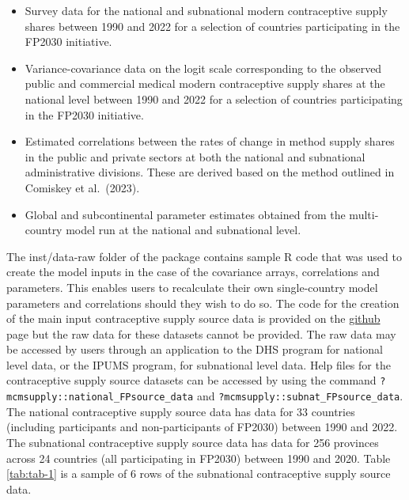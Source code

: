 \begin{itemize}
\tightlist
\item
  Survey data for the national and subnational modern contraceptive supply shares between 1990 and 2022 for a selection of countries participating in the FP2030 initiative.
\item
  Variance-covariance data on the logit scale corresponding to the observed public and commercial medical modern contraceptive supply shares at the national level between 1990 and 2022 for a selection of countries participating in the FP2030 initiative.
\item
  Estimated correlations between the rates of change in method supply shares in the public and private sectors at both the national and subnational administrative divisions. These are derived based on the method outlined in Comiskey et al.~(2023).
\item
  Global and subcontinental parameter estimates obtained from the multi-country model run at the national and subnational level.
\end{itemize}

The inst/data-raw folder of the  package contains sample R code that was used to create the model inputs in the case of the covariance arrays, correlations and parameters. This enables users to recalculate their own single-country model parameters and correlations should they wish to do so. The code for the creation of the main input contraceptive supply source data is provided on the  \href{https://github.com/hannahcomiskey/mcmsupply}{github} page but the raw data for these datasets cannot be provided. The raw data may be accessed by users through an application to the DHS program for national level data, or the IPUMS program, for subnational level data. Help files for the contraceptive supply source datasets can be accessed by using the command \texttt{?mcmsupply::national\_FPsource\_data} and \texttt{?mcmsupply::subnat\_FPsource\_data}. The national contraceptive supply source data has data for 33 countries (including participants and non-participants of FP2030) between 1990 and 2022. The subnational contraceptive supply source data has data for 256 provinces across 24 countries (all participating in FP2030) between 1990 and 2020. Table \ref{tab:tab-1} is a sample of 6 rows of the subnational contraceptive supply source data.



